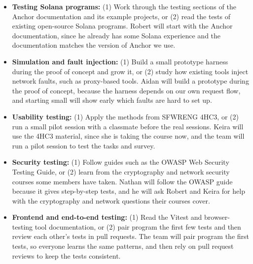 \documentclass[12pt]{article}
\begin{document}
\begin{enumerate}
  \begin{itemize}
    \item \textbf{Testing Solana programs:} (1) Work through the testing
    sections of the Anchor documentation and its example projects, or (2)
    read the tests of existing open-source Solana programs. Robert will start
    with the Anchor documentation, since he already has some Solana
    experience and the documentation matches the version of Anchor we use.
    \item \textbf{Simulation and fault injection:} (1) Build a small prototype
    harness during the proof of concept and grow it, or (2) study how existing
    tools inject network faults, such as proxy-based tools. Aidan will build
    a prototype during the proof of concept, because the harness depends on
    our own request flow, and starting small will show early which faults are
    hard to set up.
    \item \textbf{Usability testing:} (1) Apply the methods from SFWRENG 4HC3,
    or (2) run a small pilot session with a classmate before the real
    sessions. Keira will use the 4HC3 material, since she is taking the
    course now, and the team will run a pilot session to test the tasks and
    survey.
    \item \textbf{Security testing:} (1) Follow guides such as the OWASP
    Web Security Testing Guide, or (2) learn from the cryptography and network
    security courses some members have taken. Nathan will follow the OWASP
    guide because it gives step-by-step tests, and he will ask Robert and Keira
    for help with the cryptography and network questions their courses cover.
    \item \textbf{Frontend and end-to-end testing:} (1) Read the Vitest and
    browser-testing tool documentation, or (2) pair program the first few
    tests and then review each other's tests in pull requests. The team will
    pair program the first tests, so everyone learns the same patterns, and
    then rely on pull request reviews to keep the tests consistent.
  \end{itemize}
\end{enumerate}
\end{document}

